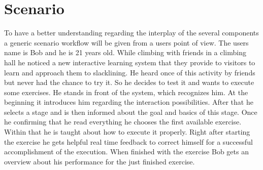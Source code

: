 \section{Scenario}\label{4_6_scenario}
To have a better understanding regarding the interplay of the several components a generic scenario workflow will be given from a users point of view. The users name is Bob and he is 21 years old. While climbing with friends in a climbing hall he noticed a new interactive learning system that they provide to visitors to learn and approach them to slacklining. He heard once of this activity by friends but never had the chance to try it. So he decides to test it and wants to execute some exercises. He stands in front of the system, which recognizes him. At the beginning it introduces him regarding the interaction possibilities. After that he selects a stage and is then informed about the goal and basics of this stage. Once he confirming that he read everything he chooses the first available exercise. Within that he is taught about how to execute it properly. Right after starting the exercise he gets helpful real time feedback to correct himself for a successful accomplishment of the execution. When finished with the exercise Bob gets an overview about his performance for the just finished exercise.


